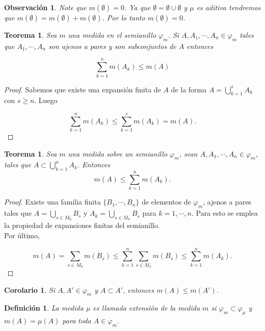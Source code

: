 \documentclass[twoside,12pt,a4 paper,openright]{book}
\newtheorem{teo}[claim]{Teorema}
\newtheorem{cor}[claim]{Corolario}
\newtheorem{defi}[claim]{Definici\'on}
\newtheorem{ob}[claim]{Observaci\'on}
\begin{document}
\begin{ob} Note que $m(\emptyset) = 0$. Ya que 
  $\emptyset = \emptyset\cup \emptyset$ y $\mu$ es aditiva tendremos que  $m(\emptyset) = m(\emptyset) + m(\emptyset)$. Por lo tanto $m(\emptyset) = 0$.
\end{ob}

\begin{teo}
    Sea $m$ una medida en el semianillo $\varphi_m$. Si $A, A_1,\cdots, A_n \in \varphi_m$ tales que  $A_1,\cdots,A_n$ son ajenos a pares y son subconjuntos de $A$ entonces 

    $$\sum_{k=1}^{n}m(A_k) \leq m(A) $$
\end{teo}
\begin{proof}
    Sabemos que existe una expansi\'on finita de $A$ de la forma $A = \bigcup_{k=1}^{s}A_k$ con $s\geq n$. Luego

    $$\sum_{k=1}^{n}m(A_k) \leq \sum_{k=1}^{s}m(A_k) = m(A).$$
\end{proof}

\begin{teo}
    Sea $m$ una medida sobre un semianillo $\varphi_m$, sean $A, A_1,\cdots, A_n \in \varphi_m$, tales que $A \subset \bigcup_{k=1}^{n}A_k$. Entonces 
    $$m(A) \leq \sum_{k=1}^{n}m(A_k) . $$
\end{teo}
\begin{proof}
    Existe una familia finita $\{B_1, \cdots, B_n\}$ de elementos de $\varphi_m$, ajenos a pares tales que $ \displaystyle A=\bigcup_{s\in M_0}B_s$ y $\displaystyle A_k = \bigcup_{s\in M_k}B_s$ para $k = 1,\cdots,n$.   Para esto se emplea  la propiedad de expansiones finitas  del semianillo.\\

    Por \'ultimo, 

    $$m(A) = \sum_{s\in M_0}m(B_s) \leq \sum_{k=1}^{n}\sum_{s\in M_k}m(B_s)\leq \sum_{k=1}^{n}m(A_k).$$
\end{proof}
\begin{cor}
    Si $A,A'\in \varphi_m$ y $A\subset A'$, entonces $m(A)\leq m(A')$.
\end{cor}
\begin{defi}
    La medida $\mu$ es llamada extensi\'on de la medida $m$ si $\varphi_m \subset \varphi_\mu$ y $m(A)= \mu(A)$ para toda $A\in \varphi_m$.
\end{defi}
\end{document}
